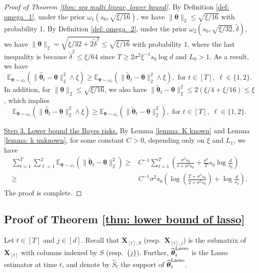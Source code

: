 \documentclass[aos,preprint]{imsart}
\theoremstyle{plain}
\theoremstyle{definition}
\newcommand{\btheta}{\boldsymbol{\theta}}
\newcommand{\hbtheta}{\widehat{\boldsymbol{\theta}}}
\newcommand{\bX}{\boldsymbol{X}}
\newcommand{\ltheta}{\hbtheta^{\textup{Lasso}}}
\newcommand{\Exp}{\mathbb{E}}
\begin{document}
\begin{appendix}
\begin{proof}[Proof of Theorem \ref{thm: seq multi linear, lower bound}]
By Definition \ref{def: omega_1}, under the prior $\omega_1(s_0, \sqrt{\xi/16})$, we have $\|\btheta\|_2 \leq \sqrt{\xi/16}$ with probability 1. By Definition \ref{def: omega_2}, under the prior $\omega_2(s_0, \sqrt{\xi/32}, \tilde{\delta})$, we have $\|\btheta\|_2 = \sqrt{\xi/32 + 2\tilde{\delta}^2}\le \sqrt{\xi/16}$ with probability 1, where the last inequality is because $\tilde{\delta}^2 \leq \xi/64$ since $T\ge 2\sigma^2 \xi^{-1}s_0\log d$ and $L_0 > 1$. As a result, we have
$$\Exp_{\btheta \sim \omega_\ell}\left(  \|\hbtheta_t-\btheta\|_2^2\wedge \xi  \right)
\geq \Exp_{\btheta \sim \omega_\ell}\left(  \|\widetilde{\btheta}_t-\btheta\|_2^2\wedge \xi  \right)
, \text{ for } t \in [T],\; \ell \in \{1,2\}.
$$
In addition, for $\|\btheta\|_2 \leq \sqrt{\xi/16}$, we also have $
\|\widetilde{\btheta}_t-\btheta\|_2^2 \leq 2 ( \xi/4 + \xi/16) \leq \xi$, which implies
$$\Exp_{\btheta \sim \omega_\ell}\left(  \|\hbtheta_t-\btheta\|_2^2\wedge \xi  \right)
\geq \Exp_{\btheta \sim \omega_\ell}\left(  \|\widetilde{\btheta}_t-\btheta\|_2^2  \right)
, \text{ for } t \in [T],\; \ell \in \{1,2\}.
$$

\medskip
\noindent \underline{Step 3. Lower bound the Bayes risks.} By Lemma \ref{lemma: K known} and Lemma \ref{lemma: k unknown},  for some constant $C > 0$, depending only on $\xi$ and $L_1$, we have
\begin{equation*} %
\begin{aligned}
\sum_{t=1}^{T}\sum_{\ell=1}^{2}   \Exp_{\btheta \sim \omega_\ell}\left(  \|\widetilde{\btheta}_t-\btheta\|_2^2  \right) 
\geq&  C^{-1} \sum_{t=1}^{T} \left(\frac{\sigma^2 s_0}{t+\sigma^2s_0} + \frac{\sigma^2}{T}s_0\log\frac{d}{s_0} \right) \\
\geq&  C^{-1} \sigma^2 s_0 \left(\log\left( \frac{T+\sigma^2 s_0}{2+\sigma^2s_0} \right)+ \log\frac{d}{s_0} \right).
\end{aligned}
\end{equation*}
The proof is complete.
\end{proof}



\subsection{Proof of Theorem \ref{thm: lower bound of lasso}} \label{sec: proof of thm: lower bound of lasso}
Let $t \in [T]$ and $j \in [d]$. Recall that $\bX_{[t],S}$ (resp.~$\bX_{[t],j}$) is the submatrix of $\bX_{[t]}$ with columns indexed by $S$ (resp.~$\{j\}$). Further, $\ltheta_t$ is the Lasso estimator at time $t$, and denote by $\hat{S}_t$ the support of $\ltheta_t$.



\end{appendix}
\end{document}
